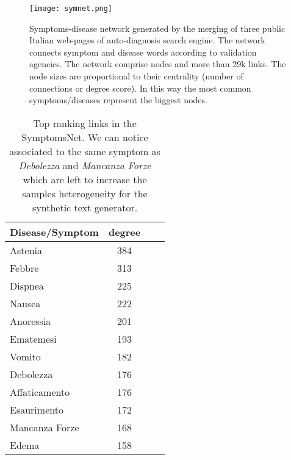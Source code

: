 \documentclass{standalone}
\begin{document}
\begin{figure}[htbp]
\centering
\texttt{[image: symnet.png]}
\caption{Symptoms-disease network generated by the merging of three public Italian web-pages of auto-diagnosis search engine.
The network connects symptom and disease words according to validation agencies.
The network comprise  nodes and more than 29k links.
The node sizes are proportional to their centrality (number of connections or degree score).
In this way the most common symptoms/diseases represent the biggest nodes.
}
\label{fig:net}
\end{figure}

\begin{table}[htbp]
\centering
\begin{tabular}{lccc}
\hline \rowcolor{darkgrayrow}
Disease/Symptom & degree \\
\hline
Astenia         & 384    \\
Febbre          & 313    \\
Dispnea         & 225    \\
Nausea          & 222    \\
Anoressia       & 201    \\
Ematemesi       & 193    \\
Vomito          & 182    \\
Debolezza       & 176    \\
Affaticamento   & 176    \\
Esaurimento     & 172    \\
Mancanza Forze  & 168    \\
Edema           & 158    \\
\hline
\end{tabular}
\caption{Top ranking links in the \textsf{SymptomsNet}. We can notice  associated to the same symptom as \emph{Debolezza} and \emph{Mancanza Forze} which are left to increase the samples heterogeneity for the synthetic text generator.}
\label{tab:rank}
\end{table}
\end{document}
